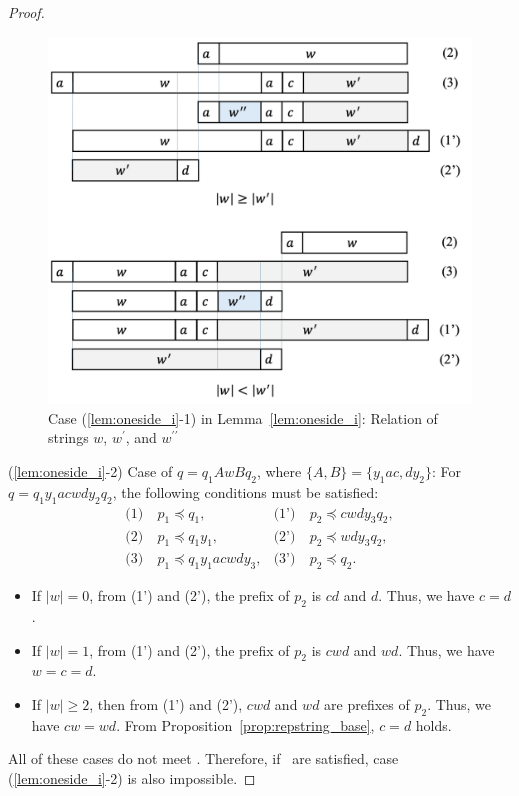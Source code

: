 \begin{proof}
  \begin{figure}[t]
    \begin{center}
      \includegraphics[scale=0.345]{figs/centerproof2.pdf}
      \caption{Case (\ref{lem:oneside_i}-1) in Lemma~\ref{lem:oneside_i}: Relation of strings $w$, $w^{\prime}$, and $w^{\prime\prime}$}\label{fig:centerproof2}
    \end{center}
    \end{figure}

\smallskip

\noindent
(\ref{lem:oneside_i}-2) Case of $q=q_{1}AwBq_{2}$, where $\{ A,B \} = \{ y_{1}ac,dy_{2} \}$:
For $q=q_{1}y_{1}acwdy_{2}q_{2}$, the following conditions must be satisfied:
\begin{align*}
  \textrm{(1)}~& p_{1} \preceq q_{1}, & \textrm{(1')}~& p_{2} \preceq cwdy_{3}q_{2}, \\
  \textrm{(2)}~& p_{1} \preceq q_{1}y_{1}, & \textrm{(2')}~& p_{2} \preceq wdy_{3}q_{2}, \\
  \textrm{(3)}~& p_{1} \preceq q_{1}y_{1}acwdy_{3}, & \textrm{(3')}~& p_{2} \preceq q_{2}.
\end{align*}

\begin{itemize}
\item If $|w|=0$, from (1') and (2'), the prefix of $p_{2}$ is $cd$ and $d$. Thus, we have $c=d$.
\item If $|w|=1$, from (1') and (2'), the prefix of $p_{2}$ is $cwd$ and $wd$. Thus, we have $w=c=d$.
\item If $|w| \ge 2$, then from (1') and (2'), $cwd$ and $wd$ are prefixes of $p_{2}$. Thus, we have $cw=wd$. From Proposition~\ref{prop:repstring_base}, $c=d$ holds.
\end{itemize}
All of these cases do not meet \TheConditionB.
Therefore, if \TheConditionB\ are satisfied, case (\ref{lem:oneside_i}-2) is also impossible.


\end{proof}

